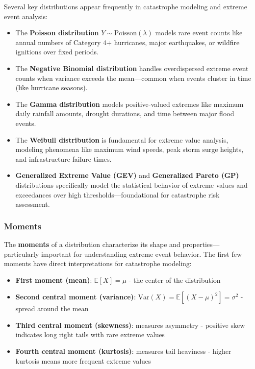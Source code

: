 \documentclass[
  letterpaper,
  DIV=11,
  numbers=noendperiod]{scrreprt}
\providecommand{\tightlist}{%
  \setlength{\itemsep}{0pt}\setlength{\parskip}{0pt}}
\begin{document}
Several key distributions appear frequently in catastrophe modeling and
extreme event analysis:

\begin{itemize}
\tightlist
\item
  The \textbf{Poisson distribution} \(Y \sim \text{Poisson}(\lambda)\)
  models rare event counts like annual numbers of Category 4+
  hurricanes, major earthquakes, or wildfire ignitions over fixed
  periods.
\item
  The \textbf{Negative Binomial distribution} handles overdispersed
  extreme event counts when variance exceeds the mean---common when
  events cluster in time (like hurricane seasons).
\item
  The \textbf{Gamma distribution} models positive-valued extremes like
  maximum daily rainfall amounts, drought durations, and time between
  major flood events.
\item
  The \textbf{Weibull distribution} is fundamental for extreme value
  analysis, modeling phenomena like maximum wind speeds, peak storm
  surge heights, and infrastructure failure times.
\item
  \textbf{Generalized Extreme Value (GEV)} and \textbf{Generalized
  Pareto (GP)} distributions specifically model the statistical behavior
  of extreme values and exceedances over high thresholds---foundational
  for catastrophe risk assessment.
\end{itemize}

\subsubsection{Moments}\label{moments}

The \textbf{moments} of a distribution characterize its shape and
properties---particularly important for understanding extreme event
behavior. The first few moments have direct interpretations for
catastrophe modeling:

\begin{itemize}
\tightlist
\item
  \textbf{First moment (mean)}: \(\mathbb{E}[X] = \mu\) - the center of
  the distribution
\item
  \textbf{Second central moment (variance)}:
  \(\text{Var}(X) = \mathbb{E}[(X - \mu)^2] = \sigma^2\) - spread around
  the mean\\
\item
  \textbf{Third central moment (skewness)}: measures asymmetry -
  positive skew indicates long right tails with rare extreme values
\item
  \textbf{Fourth central moment (kurtosis)}: measures tail heaviness -
  higher kurtosis means more frequent extreme values
\end{itemize}
\end{document}
